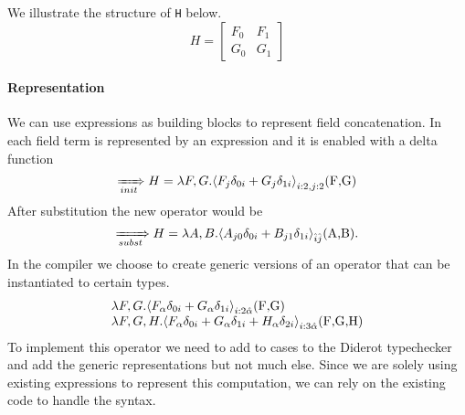 \documentclass{article}
\begin{document}
\noindent We illustrate the structure of \lstinline[mathescape=true]!H! below.  
\begin{displaymath}
  H=\left[ \begin{array}{ll}
  F_0  & F_1\\
  G_0  &G_1
  \end{array}
 \right]  
 \end{displaymath}
 
\paragraph{Representation}
We can use \name{} expressions as building blocks to represent field concatenation. 
In \name{} each field term is represented by an  expression and it is enabled with a delta function 
$$\rewriteInitA{} H=\lambda F,G.\EinExp{F_{j }\delta_{0i}+G_{j }\delta_{1i}}{i:2,j:2}\text{(\lstinline[mathescape=true]!F,G!)}$$
After substitution the new \name{} operator would be 
$$\rewriteSubst{}H=\lambda A,B.\EinExp{A_{j 0}\delta_{0i}+B_{j 1}\delta_{1i}}{\hat{i}\hat{j}}\text{(\lstinline[mathescape=true]!A,B!)}.$$
In the compiler we choose to create generic versions of an \name{} operator that can be instantiated to certain types.
$$\begin{array}{l}
\lambda F,G. \EinExp{F_{\alpha }\delta_{0i}+G_{\alpha }\delta_{1i}}{{i:2} \hat{\alpha} }\text{(\lstinline[mathescape=true]!F,G!)}\\
\lambda F,G, H.\EinExp{F_{\alpha }\delta_{0i}+G_{\alpha }\delta_{1i}+H_{\alpha }\delta_{2i}}{{i:3} \hat{\alpha} }\text{(\lstinline[mathescape=true]!F,G,H!)}
\end{array}$$
To implement this operator we  need to add to cases to the Diderot typechecker and add the generic representations but not much else.
Since we are solely using existing \name{} expressions to represent this computation, we can rely on the existing code to handle the \name{} syntax.
\end{document}
